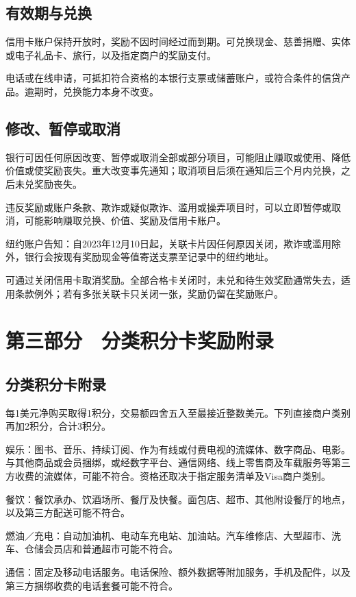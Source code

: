 \documentclass[UTF8,fontset=none,11pt,a4paper]{ctexart}
\begin{document}
\subsection*{有效期与兑换}
信用卡账户保持开放时，奖励不因时间经过而到期。可兑换现金、慈善捐赠、实体或电子礼品卡、旅行，以及指定商户的奖励支付。


电话或在线申请，可抵扣符合资格的本银行支票或储蓄账户，或符合条件的信贷产品。逾期时，兑换能力本身不改变。


\subsection*{修改、暂停或取消}
银行可因任何原因改变、暂停或取消全部或部分项目，可能阻止赚取或使用、降低价值或使奖励丧失。重大改变事先通知；取消项目后须在通知后三个月内兑换，之后未兑奖励丧失。


违反奖励或账户条款、欺诈或疑似欺诈、滥用或操弄项目时，可以立即暂停或取消，可能影响赚取兑换、价值、奖励及信用卡账户。


纽约账户告知：自2023年12月10日起，关联卡片因任何原因关闭，欺诈或滥用除外，银行会按现有奖励现金等值寄送支票至记录中的纽约地址。


可通过关闭信用卡取消奖励。全部合格卡关闭时，未兑和待生效奖励通常失去，适用条款例外；若有多张关联卡只关闭一张，奖励仍留在奖励账户。


\section*{第三部分　分类积分卡奖励附录}
\subsection*{分类积分卡附录}
每1美元净购买取得1积分，交易额四舍五入至最接近整数美元。下列直接商户类别再加2积分，合计3积分。


娱乐：图书、音乐、持续订阅、作为有线或付费电视的流媒体、数字商品、电影。与其他商品或会员捆绑，或经数字平台、通信网络、线上零售商及车载服务等第三方收费的流媒体，可能不符合。资格还取决于指定服务清单及Visa商户类别。


餐饮：餐饮承办、饮酒场所、餐厅及快餐。面包店、超市、其他附设餐厅的地点，以及第三方配送可能不符合。


燃油／充电：自动加油机、电动车充电站、加油站。汽车维修店、大型超市、洗车、仓储会员店和普通超市可能不符合。


通信：固定及移动电话服务。电话保险、额外数据等附加服务，手机及配件，以及第三方捆绑收费的电话套餐可能不符合。
\end{document}
